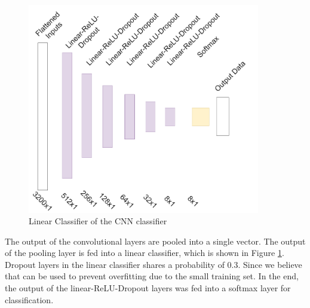 \begin{par}
    \begin{figure}[H]
        \centering
        \includegraphics[width=4in]{image/cnn_classifier_architecture}
        \caption{Linear Classifier of the CNN classifier}
        \label{fig:cnn_class}
    \end{figure}
    
    \par \hspace{15pt} The output of the convolutional layers are pooled into a single vector. The output of the pooling layer is fed into a linear classifier, which is shown in Figure \ref{fig:cnn_class}. Dropout layers in the linear classifier shares a probability of $0.3$. Since we believe that can be used to prevent overfitting due to the small training set. In the end, the output of the linear-ReLU-Dropout layers was fed into a softmax layer for classification.

\end{par}